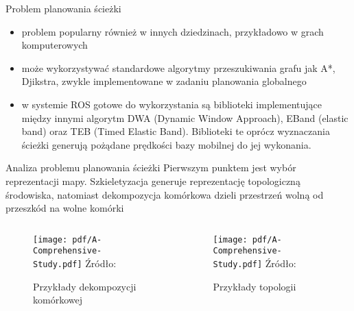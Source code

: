 \begin{frame}
{Problem planowania ścieżki}
\begin{itemize}
	\item problem popularny również w innych dziedzinach, przykładowo w grach komputerowych \cite{robotics_and_games}
	\item może wykorzystywać standardowe algorytmy przeszukiwania grafu jak A*, Djikstra, zwykle implementowane w zadaniu planowania globalnego
	\item w systemie ROS gotowe do wykorzystania są biblioteki implementujące między innymi algorytm DWA (Dynamic Window Approach), EBand (elastic band) oraz TEB (Timed Elastic Band). Biblioteki te oprócz wyznaczania ścieżki generują pożądane prędkości bazy mobilnej do jej wykonania.
\end{itemize}
\end{frame}

\begin{frame}
{Analiza problemu planowania ścieżki}
	Pierwszym punktem jest wybór reprezentacji mapy.
	Szkieletyzacja generuje reprezentację topologiczną środowiska, natomiast dekompozycja komórkowa dzieli przestrzeń wolną od przeszkód na wolne komórki	
	\begin{columns}
		\begin{column}{0.5\textwidth}
			\begin{figure}
				\begin{center}
					\texttt{[image: pdf/A-Comprehensive-Study.pdf]}
					\hspace*{5pt}\hbox{\scriptsize{Źródło:}}
					\caption{Przykłady dekompozycji komórkowej }
				\end{center}
			\end{figure}
		\end{column}
		\begin{column}{0.5\textwidth}  %
						\begin{figure}
				\begin{center}
					\texttt{[image: pdf/A-Comprehensive-Study.pdf]}
					\hspace*{5pt}\hbox{\scriptsize{Źródło:}}
					\caption{Przykłady topologii}
				\end{center}
			\end{figure}
		\end{column}
	\end{columns}
\end{frame}

